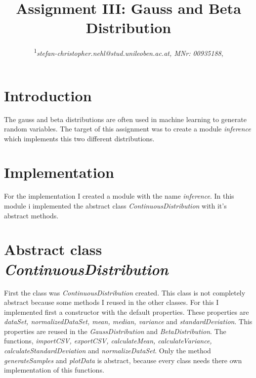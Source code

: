 \documentclass[10pt, a4paper, twocolumn]{article} %
\title{Assignment III: Gauss and Beta Distribution} %
\author{
	\coursetitle{Exercises in Machine Learning (190.013), SS2022}
	\authorstyle{Stefan Nehl\textsuperscript{1}} %
	\newline\newline %
	\textsuperscript{1}\textit{stefan-christopher.nehl@stud.unileoben.ac.at, MNr: 00935188}, \institution{Montanuniversität Leoben, Austria}\\ %
	\newline\submissiondate{\today} %
}
\begin{document}

\maketitle %

\thispagestyle{firstpage} %




\section{Introduction}

The gauss and beta distributions are often used in machine learning to generate random variables. The target of this assignment was to create a module \textit{inference} which implements this two different distributions. 

\section{Implementation}
For the implementation I created a module with the name \textit{inference}. In this module i implemented the abstract class \textit{ContinuousDistribution} with it's abstract methods. 

\section{Abstract class \textit{ContinuousDistribution}}
First the class was \textit{ContinuousDistribution} created. This class is not completely abstract because some methods I reused in the other classes. For this I implemented first a constructor with the default properties. These properties are \textit{dataSet, normalizedDataSet, mean, median, variance} and \textit{standardDeviation}. This properties are reused in the \textit{GaussDistribution} and \textit{BetaDistribution}. The functions, \textit{importCSV, exportCSV, calculateMean, calculateVariance, calculateStandardDeviation} and \textit{normalizeDataSet}. Only the method \textit{generateSamples} and \textit{plotData} is abstract, because every class needs there own implementation of this functions. 
\end{document}
